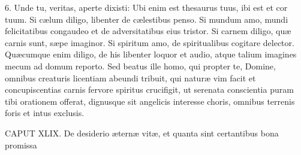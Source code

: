 6. Unde tu, veritas, aperte dixisti: Ubi enim est thesaurus tuus, ibi est et cor tuum. Si cælum diligo, libenter de cælestibus penso. Si mundum amo, mundi felicitatibus congaudeo et de adversitatibus eius tristor. Si carnem diligo, quæ carnis sunt, sæpe imaginor. Si spiritum amo, de spiritualibus cogitare delector. Quæcumque enim diligo, de his libenter loquor et audio, atque talium imagines mecum ad domum reporto. Sed beatus ille homo, qui propter te, Domine, omnibus creaturis licentiam abeundi tribuit, qui naturæ vim facit et concupiscentias carnis fervore spiritus crucifigit, ut serenata conscientia puram tibi orationem offerat, dignusque sit angelicis interesse choris, omnibus terrenis foris et intus exclusis.


CAPUT XLIX.
De desiderio æternæ vitæ, et quanta sint certantibus bona promissa

